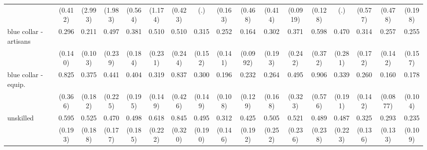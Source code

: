 {\begin{tabular}{l*{16}{c}}
                    &     (0.412)         &     (2.993)         &     (1.983)         &     (0.564)         &     (1.174)         &     (0.423)         &         (.)         &     (0.163)         &     (0.468)         &     (0.414)         &    (0.0919)         &     (0.128)         &         (.)         &     (0.577)         &     (0.478)         &     (0.198)         \\
[1em]
blue collar - artisans&       0.296\sym{*}  &       0.211\sym{**} &       0.497         &       0.381\sym{*}  &       0.510         &       0.510         &       0.315\sym{*}  &       0.252\sym{*}  &       0.164\sym{**} &       0.302         &       0.371         &       0.598         &       0.470         &       0.314\sym{*}  &       0.257\sym{*}  &       0.255\sym{*}  \\
                    &     (0.140)         &     (0.103)         &     (0.239)         &     (0.184)         &     (0.231)         &     (0.244)         &     (0.152)         &     (0.141)         &    (0.0992)         &     (0.193)         &     (0.242)         &     (0.372)         &     (0.281)         &     (0.172)         &     (0.142)         &     (0.157)         \\
[1em]
blue collar - equip.&       0.825         &       0.375\sym{*}  &       0.441         &       0.404         &       0.319\sym{*}  &       0.837         &       0.300\sym{*}  &       0.196\sym{**} &       0.232\sym{**} &       0.264\sym{*}  &       0.495         &       0.906         &       0.339         &       0.260\sym{*}  &       0.160\sym{***}&       0.178\sym{**} \\
                    &     (0.366)         &     (0.182)         &     (0.225)         &     (0.195)         &     (0.149)         &     (0.426)         &     (0.149)         &     (0.108)         &     (0.129)         &     (0.168)         &     (0.323)         &     (0.576)         &     (0.191)         &     (0.142)         &    (0.0877)         &     (0.104)         \\
[1em]
unskilled           &       0.595         &       0.525         &       0.470\sym{*}  &       0.498         &       0.618         &       0.845         &       0.495         &       0.312\sym{*}  &       0.425         &       0.505         &       0.521         &       0.489         &       0.487         &       0.325\sym{**} &       0.293\sym{**} &       0.235\sym{**} \\
                    &     (0.193)         &     (0.188)         &     (0.177)         &     (0.185)         &     (0.222)         &     (0.320)         &     (0.190)         &     (0.146)         &     (0.192)         &     (0.252)         &     (0.236)         &     (0.238)         &     (0.223)         &     (0.136)         &     (0.133)         &     (0.109)         \\

\end{tabular}}
